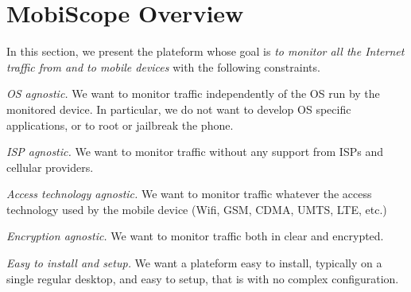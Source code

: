 \section{MobiScope Overview}
\label{sec:platform}



In this section, we present the \platname{} plateform whose goal is
\emph{to monitor all the Internet traffic from and to mobile devices}
with the following constraints.
\begin{packedenumerate}
\item \emph{OS agnostic.} We want to monitor traffic independently of
  the OS run by the monitored device. In particular, we do not want to
  develop OS specific applications, or to root or jailbreak the phone.
\item \emph{ISP agnostic.} We want to monitor traffic without any
  support from ISPs and cellular providers.
\item \emph{Access technology agnostic.} We want to monitor traffic
  whatever the access technology used by the mobile device (Wifi, GSM,
  CDMA, UMTS, LTE, etc.)
\item \emph{Encryption agnostic.} We want to monitor traffic both in
  clear and encrypted.
\item \emph{Easy to install and setup.} We want a plateform easy to
  install, typically on a single regular desktop, and easy to setup,
  that is with no complex configuration.
\end{packedenumerate}    



